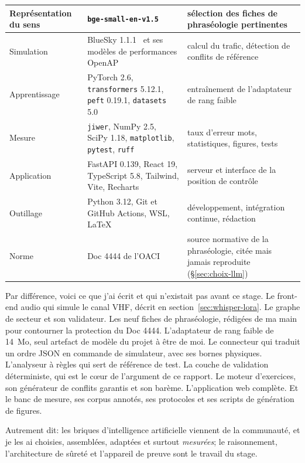 \documentclass[11pt,a4paper]{article}
\begin{document}
\begin{table}[!htbp]
\begin{tabular}{>{\raggedright\arraybackslash}p{2.7cm} >{\raggedright\arraybackslash}p{5.5cm} >{\raggedright\arraybackslash}p{6.8cm}}
Représentation du sens & \texttt{bge-small-en-v1.5} & sélection des fiches de phraséologie pertinentes\\
\midrule
Simulation & BlueSky 1.1.1~\cite{bluesky} et ses modèles de performances OpenAP & calcul du trafic, détection de conflits de référence\\
\midrule
Apprentissage & PyTorch 2.6, \texttt{transformers} 5.12.1, \texttt{peft} 0.19.1, \texttt{datasets} 5.0 & entraînement de l'adaptateur de rang faible\\
Mesure & \texttt{jiwer}, NumPy 2.5, SciPy 1.18, \texttt{matplotlib}, \texttt{pytest}, \texttt{ruff} & taux d'erreur mots, statistiques, figures, tests\\
Application & FastAPI 0.139, React 19, TypeScript 5.8, Tailwind, Vite, Recharts & serveur et interface de la position de contrôle\\
Outillage & Python 3.12, Git et GitHub Actions, WSL, \LaTeX & développement, intégration continue, rédaction\\
\midrule
Norme & Doc 4444 de l'OACI~\cite{icao4444} & source normative de la phraséologie, citée mais jamais reproduite (\S\ref{sec:choix-llm})\\
\bottomrule
\end{tabular}
\end{table}

Par différence, voici ce que j'ai écrit et qui n'existait pas avant ce stage. Le front-end audio qui simule le canal VHF, décrit en section~\ref{sec:whisper-lora}. Le graphe de secteur et son validateur. Les neuf fiches de phraséologie, rédigées de ma main pour contourner la protection du Doc 4444. L'adaptateur de rang faible de 14~Mo, seul artefact de modèle du projet à être de moi. Le connecteur qui traduit un ordre JSON en commande de simulateur, avec ses bornes physiques. L'analyseur à règles qui sert de référence de test. La couche de validation déterministe, qui est le c\oe ur de l'argument de ce rapport. Le moteur d'exercices, son générateur de conflits garantis et son barème. L'application web complète. Et le banc de mesure, ses corpus annotés, ses protocoles et ses scripts de génération de figures.

Autrement dit: les briques d'intelligence artificielle viennent de la communauté, et je les ai choisies, assemblées, adaptées et surtout \emph{mesurées}; le raisonnement, l'architecture de sûreté et l'appareil de preuve sont le travail du stage.


\end{document}
